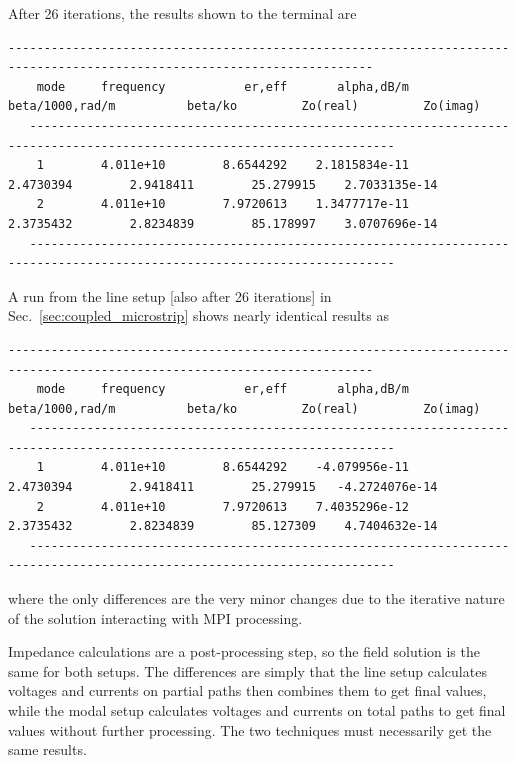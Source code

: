 \documentclass[titlepage]{article}
\renewcommand\_{\textunderscore\linebreak[1]}
\begin{document}
After 26 iterations, the results shown to the terminal are
\begin{Verbatim}[fontsize=\scriptsize]
   -------------------------------------------------------------------------------------------------------------------------
    mode     frequency           er,eff       alpha,dB/m  beta/1000,rad/m          beta/ko         Zo(real)         Zo(imag)
   -------------------------------------------------------------------------------------------------------------------------
    1        4.011e+10        8.6544292    2.1815834e-11        2.4730394        2.9418411        25.279915    2.7033135e-14
    2        4.011e+10        7.9720613    1.3477717e-11        2.3735432        2.8234839        85.178997    3.0707696e-14
   -------------------------------------------------------------------------------------------------------------------------
\end{Verbatim}
\noindent A run from the line setup [also after 26 iterations] in Sec.~\ref{sec:coupled_microstrip} shows nearly identical results as
\begin{Verbatim}[fontsize=\scriptsize]
   -------------------------------------------------------------------------------------------------------------------------
    mode     frequency           er,eff       alpha,dB/m  beta/1000,rad/m          beta/ko         Zo(real)         Zo(imag)
   -------------------------------------------------------------------------------------------------------------------------
    1        4.011e+10        8.6544292    -4.079956e-11        2.4730394        2.9418411        25.279915   -4.2724076e-14
    2        4.011e+10        7.9720613    7.4035296e-12        2.3735432        2.8234839        85.127309    4.7404632e-14
   -------------------------------------------------------------------------------------------------------------------------
\end{Verbatim}
\noindent where the only differences are the very minor changes due to the iterative nature of the solution interacting with MPI processing.

Impedance calculations are a post-processing step, so the field solution is the same for both setups.  The differences are simply that the line setup calculates voltages and currents on partial paths then combines them to get final values, while the modal setup calculates voltages and currents on total paths to get final values without further processing.  The two techniques must necessarily get the same results.
\end{document}
